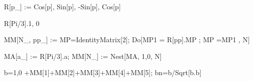 R[p_] := {{Cos[p], Sin[p]}, {-Sin[p], Cos[p]}}

R[Pi/3].{1, 0}

MM[N_, pp_] :=
MP=IdentityMatrix[2];
Do[MP1 = R[pp].MP ; MP =MP1 , {N}]

MA[a_] := R[Pi/3].a;
MM[N_] := Nest[MA,  {1,0},  N]

b={1,0}  +MM[1]+MM[2]+MM[3]+MM[4]+MM[5];
bn=b/Sqrt[b.b]
